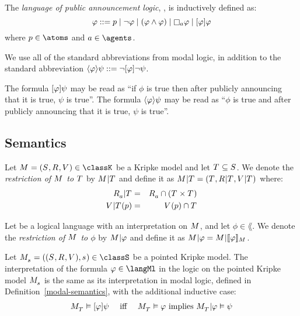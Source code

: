 \begin{definition}
The {\em language of public announcement logic}, \langPal{}, is inductively defined as:
$$
\phi ::= 
    \atomP \mid
    \lnot \phi \mid
    (\phi \land \phi) \mid
    \necessary[\agentA] \phi \mid
    \announceA{\phi} \phi
$$
where $\atomP \in \atoms$ and $\agentA \in \agents$.
\end{definition}

We use all of the standard abbreviations from modal logic, in addition to the standard abbreviation $\langle \varphi \rangle \psi ::= \lnot [ \varphi ] \lnot \psi$.

The formula $[ \varphi ] \psi$ may be read as ``if $\phi$ is true then after publicly announcing that it is true, $\psi$ is true''.
The formula $\langle \varphi \rangle \psi$ may be read as ``$\phi$ is true and after publicly announcing that it is true, $\psi$ is true''.

\subsection{Semantics}

\begin{definition}
Let $\modelAndTuple \in \classK$ be a Kripke model and let $\statesT \subseteq \states$.
We denote the {\em restriction of $\model$ to $\statesT$} by $\restrict{\model}{\statesT}$ and
define it as $\restrict{\model}{\statesT} = (\statesT, \restrict{\accessibilityRel}{\statesT}, \restrict{\valuation}{\statesT})$ where:
\begin{eqnarray*}
    \restrict{\accessibility{\agentA}}{\statesT} &=& \accessibility{\agentA} \cap (\statesT \times \statesT)\\
    \restrict{\valuation}{\statesT}(\atomP) &=& \valuation(\atomP) \cap \statesT
\end{eqnarray*}

Let \lang{} be a logical language with an interpretation on $\model$, and let $\phi \in \lang$.
We denote the {\em restriction of $\model$ to $\phi$} by $\restrict{\model}{\phi}$ and define it as $\restrict{\model}{\phi} = \restrict{\model}{\interpretation[\model]{\phi}}$.
\end{definition}

\begin{definition}
Let $\pointedModelAndTuple{\stateS} \in \classS$ be a pointed Kripke model.
The interpretation of the formula $\phi \in \langMl$ in the logic \logicPalS{} on the pointed Kripke model $\pointedModel{\stateS}$ is the same as its interpretation in modal logic, defined in Definition~\ref{modal-semantics}, with the additional inductive case:
$$
\begin{array}{lcl}
\pointedModel{\statesT} \entails \announceA{\phi} \psi & \text{ iff } & \pointedModel{\statesT} \entails \phi \text{ implies } \restrict{\pointedModel{\statesT}}{\phi} \entails \psi
\end{array}
$$
\end{definition}

